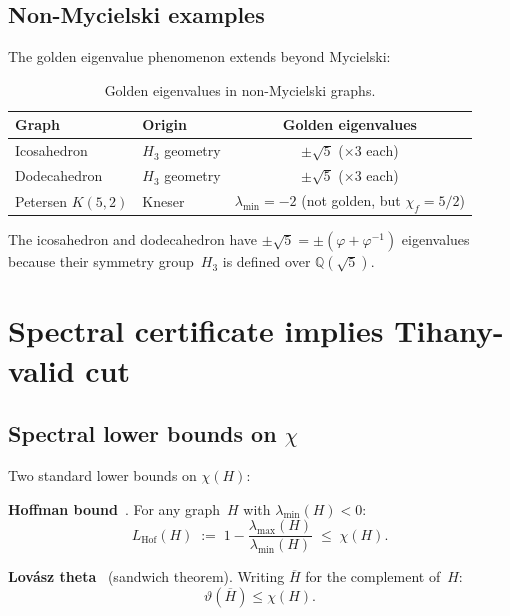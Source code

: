 \documentclass[11pt,a4paper]{amsart}
\theoremstyle{plain}
\theoremstyle{definition}
\theoremstyle{remark}
\newcommand{\Q}{\mathbb{Q}}
\newcommand{\vp}{\varphi}
\newcommand{\chr}{\chi}
\newcommand{\LHof}{L_{\mathrm{Hof}}}
\begin{document}
\subsection{Non-Mycielski examples}

The golden eigenvalue phenomenon extends beyond Mycielski:

\begin{table}[ht]
\centering
\caption{Golden eigenvalues in non-Mycielski graphs.}
\label{tab:non-mycielski}
\begin{tabular}{llc}
\toprule
Graph & Origin & Golden eigenvalues \\
\midrule
Icosahedron   & $H_3$ geometry & $\pm\sqrt{5}$ ($\times 3$ each) \\
Dodecahedron  & $H_3$ geometry & $\pm\sqrt{5}$ ($\times 3$ each) \\
Petersen $K(5,2)$ & Kneser & $\lambda_{\min}=-2$ (not golden, but $\chr_f = 5/2$) \\
\bottomrule
\end{tabular}
\end{table}

The icosahedron and dodecahedron have $\pm\sqrt{5} = \pm(\vp + \vp^{-1})$
eigenvalues because their symmetry group~$H_3$ is defined over $\Q(\sqrt{5})$.

\section{Spectral certificate implies Tihany-valid cut}\label{sec:certificate}

\subsection{Spectral lower bounds on \texorpdfstring{$\chr$}{χ}}

Two standard lower bounds on $\chr(H)$:

\medskip\noindent
\textbf{Hoffman bound}~\cite{hoffman1970}.  For any graph~$H$ with
$\lambda_{\min}(H) < 0$:
\begin{equation}\label{eq:hoffman}
  \LHof(H)
  \;:=\;
  1 - \frac{\lambda_{\max}(H)}{\lambda_{\min}(H)}
  \;\leq\; \chr(H).
\end{equation}

\noindent
\textbf{Lov\'asz theta}~\cite{lovasz1979} (sandwich theorem).
Writing $\overline{H}$ for the complement of~$H$:
\begin{equation}\label{eq:theta}
  \vartheta(\overline{H}) \leq \chr(H).
\end{equation}
\end{document}
